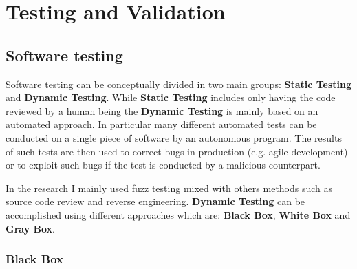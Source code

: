 \documentclass[../main.tex]{subfiles}
\begin{document}
\chapter{Testing and Validation}

\label{chap:fuzzing}

\section{Software testing}

Software testing can be conceptually divided in two main groups: \textbf{Static Testing} and \textbf{Dynamic Testing}. While \textbf{Static Testing} includes only having the code reviewed by a human being the \textbf{Dynamic Testing} is mainly based on an automated approach. In particular many different automated tests can be conducted on a single piece of software by an autonomous program. The results of such tests are then used to correct bugs in production (e.g. agile development) or to exploit such bugs if the test is conducted by a malicious counterpart.

In the research I mainly used fuzz testing mixed with others methods such as source code review and reverse engineering. \textbf{Dynamic Testing} can be accomplished using different approaches which are: \textbf{Black Box}, \textbf{White Box} and \textbf{Gray Box}.

\subsection{Black Box}
\end{document}
